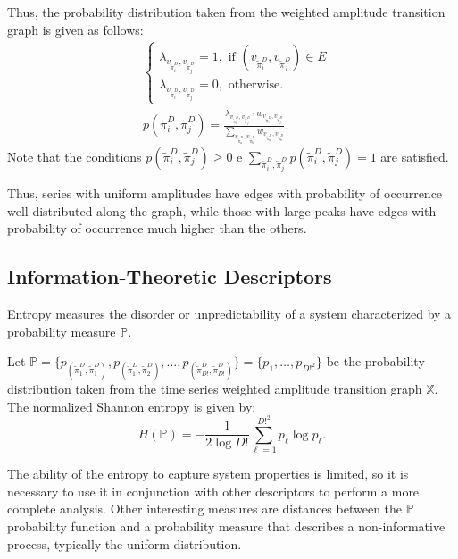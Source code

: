 \documentclass{isprs}
\begin{document}
Thus, the probability distribution taken from the weighted amplitude transition graph is given as follows:	
\begin{align}
&\left\{\begin{array}{l}
\lambda_{v_{\widetilde\pi^D_i}, v_{\widetilde\pi^D_j}} = 1, \text{ if } (v_{\widetilde\pi^D_i}, v_{\widetilde\pi^D_j}) \in {E} \\
\lambda_{v_{\widetilde\pi^D_i}, v_{\widetilde\pi^D_j}} = 0, \text{ otherwise}.
\end{array}\right. \\
%
&p(\widetilde\pi^D_i, \widetilde\pi^D_j) = \frac{\lambda_{v_{\widetilde\pi^D_i}, v_{\widetilde\pi^D_j}} \cdot w_{v_{\widetilde\pi^D_i}, v_{\widetilde\pi^D_j}}}{\sum_{v_{\widetilde\pi^D_a}, v_{\widetilde\pi^D_b}} w_{v_{\widetilde\pi^D_a}, v_{\widetilde\pi^D_b}}}.
\end{align}
Note that the conditions $p(\widetilde\pi^D_i, \widetilde\pi^D_j) \ge 0$ e $\sum_{\widetilde\pi^D_i, \widetilde\pi^D_j} p(\widetilde\pi^D_i, \widetilde\pi^D_j) = 1$ are satisfied.

Thus, series with uniform amplitudes have edges with probability of occurrence well distributed along the graph, while those with large peaks have edges with probability of occurrence much higher than the others.

\subsection{Information-Theoretic Descriptors}\label{HC}

Entropy measures the disorder or unpredictability of a system characterized by a probability measure $\mathbb{P}$.

Let $\mathbb{P} = \{p_{(\widetilde\pi^D_1, \widetilde\pi^D_1)}, p_{(\widetilde\pi^D_1, \widetilde\pi^D_2)}, \dots, p_{(\widetilde\pi^D_{D!}, \widetilde\pi^D_{D!})} \} = \{p_1,\dots,p_{D!^2}\}$ be the probability distribution taken from the time series weighted amplitude transition graph $\mathbb{X}$.
The normalized Shannon entropy is given by:	
\begin{equation}
H(\mathbb{P}) = -\frac1{2\log D!}\sum_{\ell=1}^{D!^2} p_{\ell} \log p_{\ell} .
\label{eq:Entropia}
\end{equation}

The ability of the entropy to capture system properties is limited, so it is necessary to use it in conjunction with other des\-criptors to perform a more complete analysis.
Other interesting measures are distances between the $\mathbb{P}$ probability function and a probability measure that describes a non-informative process, typically the uniform distribution.
\end{document}
